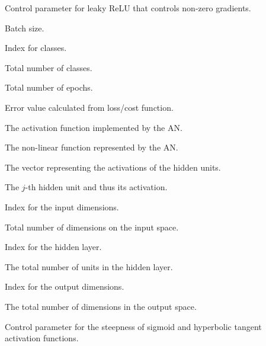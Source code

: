 \begin{description}
    \item
    [\parbox{1cm}{$\alpha$}] Control parameter for leaky ReLU that controls non-zero gradients.

    \item
    [\parbox{1cm}{$\beta$}] Batch size.

    \item
    [\parbox{1cm}{$c$}] Index for classes.

    \item
    [\parbox{1cm}{$C$}] Total number of classes.

    \item
    [\parbox{1cm}{$E$}] Total number of epochs.

    \item
    [\parbox{1cm}{$\epsilon$}] Error value calculated from loss/cost function.

    \item
    [\parbox{1cm}{$f$}] The activation function implemented by the \ac{AN}.

    \item
    [\parbox{1cm}{$f_{AN}$}] The non-linear function represented by the \ac{AN}.

    \item
    [\parbox{1cm}{$\vec{h}$}] The vector representing the activations of the hidden units.

    \item
    [\parbox{1cm}{$h_j$}] The $j$-th hidden unit and thus its activation.

    \item
    [\parbox{1cm}{$i$}] Index for the input dimensions.

    \item
    [\parbox{1cm}{$I$}] Total number of dimensions on the input space.

    \item
    [\parbox{1cm}{$j$}] Index for the hidden layer.

    \item
    [\parbox{1cm}{$J$}] The total number of units in the hidden layer.

    \item
    [\parbox{1cm}{$k$}] Index for the output dimensions.

    \item
    [\parbox{1cm}{$K$}] The total number of dimensions in the output space.

    \item
    [\parbox{1cm}{$\lambda$}] Control parameter for the steepness of sigmoid and hyperbolic tangent activation functions.


\end{description}
